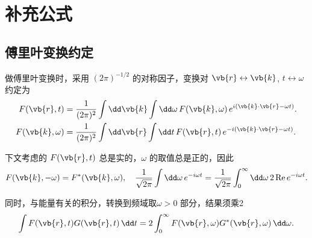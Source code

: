 \chapter{补充公式}
\section{傅里叶变换约定}
做傅里叶变换时，采用 \((2\pi)^{-1/2}\) 的对称因子，变换对 \(\vb{r} \leftrightarrow \vb{k}\), \(t \leftrightarrow \omega\) 约定为
\begin{align*}
	F(\vb{r}, t) &= \frac{1}{(2\pi)^{2}} \int \dd \vb{k} \int \dd \omega \, F(\vb{k}, \omega) \, e^{i(\vb{k} \cdot \vb{r} - \omega t)}. \\
	F(\vb{k}, \omega) &= \frac{1}{(2\pi)^{2}} \int \dd \vb{r} \int \dd t \, F(\vb{r}, t) \, e^{-i(\vb{k} \cdot \vb{r} - \omega t)}. \\
\end{align*}

下文考虑的 \(F(\vb{r}, t)\) 总是实的，\(\omega\) 的取值总是正的，因此
\begin{align*}
	F(\vb{k}, -\omega) = F^{*}(\vb{k}, \omega), \quad
	\frac{1}{\sqrt{2\pi}} \int \dd \omega \, e^{-i\omega t} = \frac{1}{\sqrt{2\pi}} \int_{0}^{\infty} \dd \omega \, 2 \, \mathrm{Re} \, e^{-i\omega t}.
\end{align*}

同时，与能量有关的积分，转换到频域取\(\omega > 0\) 部分，结果须乘2
\begin{align*}
	\int F(\vb{r}, t) G(\vb{r}, t) \, \dd t = 2 \int_{0}^{\infty} F(\vb{r}, \omega) G^{*}(\vb{r}, \omega) \, \dd \omega.
\end{align*}

